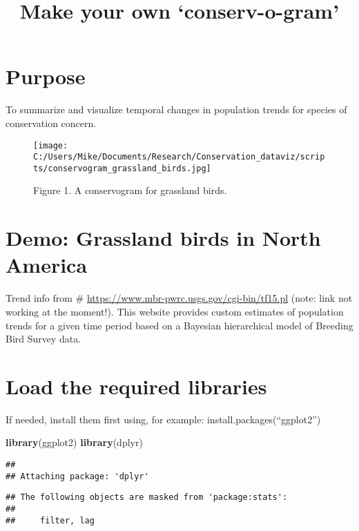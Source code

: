 \documentclass[]{article}
\title{Make your own `conserv-o-gram'}
\author{}
\date{}
\newenvironment{Shaded}{\begin{snugshade}}{\end{snugshade}}
\newcommand{\KeywordTok}[1]{\textcolor[rgb]{0.13,0.29,0.53}{\textbf{#1}}}
\newcommand{\NormalTok}[1]{#1}
\begin{document}
\maketitle

\section{Purpose}\label{purpose}

To summarize and visualize temporal changes in population trends for
species of conservation concern.

\begin{figure}
\centering
\texttt{[image: C:/Users/Mike/Documents/Research/Conservation\_dataviz/scripts/conservogram\_grassland\_birds.jpg]}
\caption{Figure 1. A conservogram for grassland birds.}
\end{figure}

\section{Demo: Grassland birds in North
America}\label{demo-grassland-birds-in-north-america}

Trend info from \# \url{https://www.mbr-pwrc.usgs.gov/cgi-bin/tf15.pl}
(note: link not working at the moment!). This website provides custom
estimates of population trends for a given time period based on a
Bayesian hierarchical model of Breeding Bird Survey data.

\section{Load the required libraries}\label{load-the-required-libraries}

If needed, install them first using, for example:
install.packages(``ggplot2'')

\begin{Shaded}
\begin{Highlighting}[]
\KeywordTok{library}\NormalTok{(ggplot2)}
\KeywordTok{library}\NormalTok{(dplyr)}
\end{Highlighting}
\end{Shaded}

\begin{verbatim}
## 
## Attaching package: 'dplyr'
\end{verbatim}

\begin{verbatim}
## The following objects are masked from 'package:stats':
## 
##     filter, lag
\end{verbatim}
\end{document}
